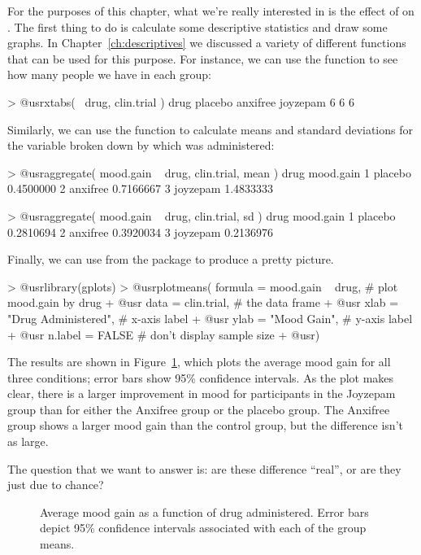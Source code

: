 For the purposes of this chapter, what we're really interested in is the effect of  on . The first thing to do is calculate some descriptive statistics and draw some graphs. In Chapter~\ref{ch:descriptives} we discussed a variety of different functions that can be used for this purpose. For instance, we can use the  function to see how many people we have in each group:
\begin{rblock1}
> @usr{xtabs( ~drug, clin.trial )}
drug
 placebo anxifree joyzepam 
       6        6        6 
\end{rblock1}
Similarly, we can use the  function to calculate means and standard deviations for the  variable broken down by which  was administered:
\begin{rblock1}
> @usr{aggregate( mood.gain ~ drug, clin.trial, mean )}
      drug mood.gain
1  placebo 0.4500000
2 anxifree 0.7166667
3 joyzepam 1.4833333

> @usr{aggregate( mood.gain ~ drug, clin.trial, sd )}
      drug mood.gain
1  placebo 0.2810694
2 anxifree 0.3920034
3 joyzepam 0.2136976
\end{rblock1}
Finally, we can use  from the  package to produce a pretty picture.
\begin{rblock1}
> @usr{library(gplots)}
> @usr{plotmeans(  formula = mood.gain ~ drug,}  # plot mood.gain by drug
+ @usr{            data = clin.trial,}           # the data frame
+ @usr{            xlab = "Drug Administered",}  # x-axis label
+ @usr{            ylab = "Mood Gain",}          # y-axis label
+ @usr{            n.label = FALSE}              # don't display sample size
+ @usr{)}
\end{rblock1}
The results are shown in Figure~\ref{fig:moodgain}, which plots the average mood gain for all three conditions; error bars show 95\% confidence intervals. As the plot makes clear, there is a larger improvement in mood for participants in the Joyzepam group than for either the Anxifree group or the placebo group. The Anxifree group shows a larger mood gain than the control group, but the difference isn't as large. 

The question that we want to answer is: are these difference ``real'', or are they just due to chance?


\begin{figure}
\begin{center}
\caption{Average mood gain as a function of drug administered. Error bars depict 95\% confidence intervals associated with each of the group means.}
\HR
\label{fig:moodgain}
\end{center}
\end{figure}




